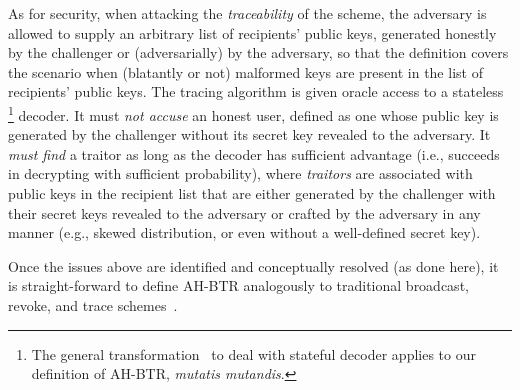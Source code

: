 As for security,
when attacking the \emph{traceability} of the scheme, the adversary is allowed to supply an arbitrary list of recipients' public keys, generated honestly by the challenger or (adversarially) by the adversary, so that the definition covers the scenario when (blatantly or not) malformed keys are present in the list of recipients' public keys.
The tracing algorithm is given oracle access to a stateless%
\footnote{The general transformation~\cite{DRM:KiaYun01,EC:BonSahWat06} to deal with stateful decoder applies to our definition of AH-BTR, \textit{mutatis mutandis}.}
decoder.
It must \emph{not accuse} an honest user, defined as one whose public key is generated by the challenger without its secret key revealed to the adversary.
It \emph{must find} a traitor as long as the decoder has sufficient advantage (i.e., succeeds in decrypting with sufficient probability), where \emph{traitors} are associated with public keys in the recipient list that are either generated by the challenger with their secret keys revealed to the adversary or crafted by the adversary in any manner (e.g., skewed distribution, or even without a well-defined secret key).

Once the issues above are identified and conceptually resolved (as done here),
it is straight-forward to define AH-BTR analogously to traditional broadcast, revoke, and trace schemes~\cite{FC:NaoPin00,C:NaoNaoLot01,C:GQWW19}.
